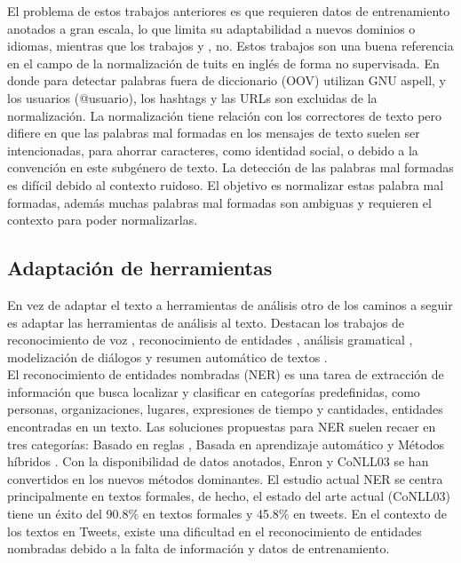 \documentclass[spanish,12pt, a4paper,twoside]{paper}
\begin{document}
El problema de estos trabajos anteriores es que requieren datos de entrenamiento anotados a gran escala, lo que limita su adaptabilidad a nuevos dominios o idiomas, mientras que los trabajos \cite{whitelaw:2009} y \cite{baldwin:2011}, no. Estos trabajos son una buena referencia en el campo de la normalización de tuits en inglés de forma no supervisada. En donde para detectar palabras fuera de diccionario (OOV) utilizan GNU aspell, y los usuarios (@usuario), los hashtags y las URLs son excluidas de la normalización. La normalización tiene relación con los correctores de texto \cite{peterson:1980} pero difiere en que las palabras mal formadas en los mensajes de texto suelen ser intencionadas, para ahorrar caracteres, como identidad social, o debido a la convención en este subgénero de texto. La detección de las palabras mal formadas es difícil debido al contexto ruidoso. El objetivo es normalizar estas palabra mal formadas, además muchas palabras mal formadas son ambiguas y requieren el contexto para poder normalizarlas.

\subsection{Adaptación de herramientas}\label{sec:adaptaciondeherramientas}
En vez de adaptar el texto a herramientas de análisis otro de los caminos a seguir es adaptar las herramientas de análisis al texto. Destacan los trabajos de reconocimiento de voz \cite{gimpel:2011} \cite{owoputi:2013}, reconocimiento de entidades \cite{finin:2010} \cite{ritter:2011} \cite{liu:2011}, análisis gramatical \cite{foster:2011}, modelización de diálogos \cite{ritter:2010} y resumen automático de textos \cite{sharifi:2010}.\\

El reconocimiento de entidades nombradas (NER) es una tarea de extracción de información que busca localizar y clasificar en categorías predefinidas, como personas, organizaciones, lugares, expresiones de tiempo y cantidades, entidades encontradas en un texto. Las soluciones propuestas para NER suelen recaer en tres categorías: Basado en reglas \cite{krupkahausman:1998}, Basada en aprendizaje automático \cite{finkelmanning:2009} \cite{singh:2010} y Métodos híbridos \cite{jansche:2002}. Con la disponibilidad de datos anotados, Enron \cite{minkov:2005} y CoNLL03 \cite{tjong:2003} se han convertidos en los nuevos métodos dominantes. El estudio actual NER se centra principalmente en textos formales, de hecho, el estado del arte actual (CoNLL03) tiene un éxito del 90.8\% en textos formales y 45.8\% en tweets. En el contexto de los textos en Tweets, existe una dificultad en el reconocimiento de entidades nombradas debido a la falta de información y datos de entrenamiento.\\
\end{document}
